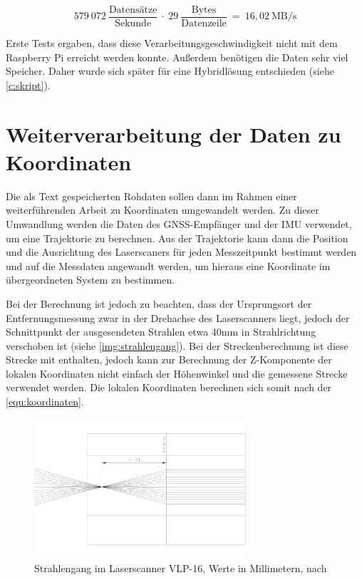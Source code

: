 \documentclass[a4paper,12pt,bibliography=totoc, listof=totoc,titlepage,pointlessnumbers]{scrreprt}
\begin{document}
\begin{equation}
579~072~\frac{\text{Datens\"{a}tze}}{\text{Sekunde}}~\cdot~29~\frac{\text{Bytes}}{\text{Datenzeile}}~=~16,02~\text{MB/s}
\label{equ:Datenrate}
\end{equation}

Erste Tests ergaben, dass diese Verarbeitungsgeschwindigkeit nicht mit dem Rasp\-berry Pi erreicht werden konnte. Außerdem benötigen die Daten sehr viel Speicher. Daher wurde sich später für eine Hybridlösung entschieden (siehe \autoref{c:skript}).

\section{Weiterverarbeitung der Daten zu Koordinaten}
Die als Text gespeicherten Rohdaten sollen dann im Rahmen einer weiterführenden Arbeit zu Koordinaten umgewandelt werden. Zu dieser Umwandlung werden die Daten des GNSS-Empfänger und der IMU verwendet, um eine Trajektorie zu berechnen. Aus der Trajektorie kann dann die Position und die Ausrichtung des Laser\-scan\-ers für jeden Messzeitpunkt bestimmt werden und auf die Messdaten angewandt werden, um hieraus eine Koordinate im übergeordneten System zu bestimmen.

Bei der Berechnung ist jedoch zu beachten, dass der Ursprungsort der Entfernungsmessung zwar in der Drehachse des Laser\-scan\-ners liegt, jedoch der Schnittpunkt der ausgesendeten Strahlen etwa 40mm in Strahlrichtung verschoben ist (siehe \autoref{img:strahlengang}). Bei der Streckenberechnung ist diese Strecke mit enthalten, jedoch kann zur Berechnung der Z-Komponente der lokalen Koordinaten nicht einfach der Höhenwinkel und die gemessene Strecke verwendet werden. Die lokalen Koordinaten berechnen sich somit nach der \autoref{equ:koordinaten}.

\begin{figure}[!ht]
 \centering
 \includegraphics[width=0.7\textwidth]{./img/Strahlengang.png}
 \caption{Strahlengang im Laser\-scan\-ner VLP-16, Werte in Millimetern, nach 
\citet{vlpCAD}}
 \label{img:strahlengang}
\end{figure}
\end{document}
